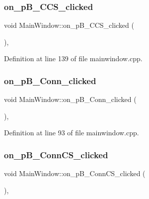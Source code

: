 \subsubsection{\texorpdfstring{on\+\_\+p\+B\+\_\+\+C\+C\+S\+\_\+clicked}{on\_pB\_CCS\_clicked}}
{\footnotesize\ttfamily void Main\+Window\+::on\+\_\+p\+B\+\_\+\+C\+C\+S\+\_\+clicked (\begin{DoxyParamCaption}{ }\end{DoxyParamCaption})\hspace{0.3cm}{\ttfamily [private]}, {\ttfamily [slot]}}



Definition at line 139 of file mainwindow.\+cpp.

\mbox{\label{class_main_window_a232344f7a1d51e055f29c29ebc77b625}} 
\subsubsection{\texorpdfstring{on\+\_\+p\+B\+\_\+\+Conn\+\_\+clicked}{on\_pB\_Conn\_clicked}}
{\footnotesize\ttfamily void Main\+Window\+::on\+\_\+p\+B\+\_\+\+Conn\+\_\+clicked (\begin{DoxyParamCaption}{ }\end{DoxyParamCaption})\hspace{0.3cm}{\ttfamily [private]}, {\ttfamily [slot]}}



Definition at line 93 of file mainwindow.\+cpp.

\mbox{\label{class_main_window_a4dbd0c0d64bff1ba16da7327ba14ed1f}} 
\subsubsection{\texorpdfstring{on\+\_\+p\+B\+\_\+\+Conn\+C\+S\+\_\+clicked}{on\_pB\_ConnCS\_clicked}}
{\footnotesize\ttfamily void Main\+Window\+::on\+\_\+p\+B\+\_\+\+Conn\+C\+S\+\_\+clicked (\begin{DoxyParamCaption}{ }\end{DoxyParamCaption})\hspace{0.3cm}{\ttfamily [private]}, {\ttfamily [slot]}}



